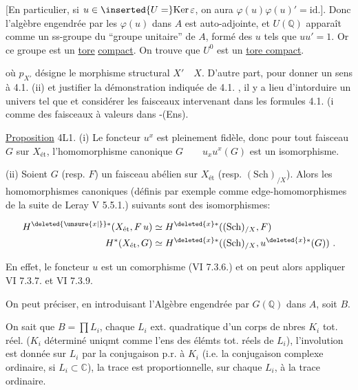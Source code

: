 [En particulier, si $u\in\inserted{U=}\mathrm{Ker}\,\varepsilon$, on aura $\varphi(u)\varphi(u)'=\mathrm{id}$.]. Donc l'algèbre engendrée par les $\varphi(u)$ dans $A$ est auto-adjointe, et $U(\mathbb Q)$ apparaît comme un ss-groupe du ``groupe unitaire'' de $A$, formé des $u$ tels que $uu'=1$.  Or ce  groupe est  un \uline{tore} \uline{compact}. On trouve que $U^0$ est un \uline{tore compact}.

où $p_{X'}$ désigne le morphisme structural $X'\quad X$. D'autre part, pour donner un sens à 4.1. (ii) et justifier la démonstration indiquée de 4.1. , il y a lieu d'intorduire un univers \quad tel que \qquad \unsure{,|;} et considérer les faisceaux intervenant dans les formules 4.1. (i comme des faisceaux à valeurs dans \quad -(Ens).

\uline{Proposition} 4L1. (i) Le foncteur $u^x$ est pleinement fidèle, donc pour tout faisceau $G$ sur $X_{\text{ét}}$, l'homomorphisme canonique $G\qquad u_x u^x(G)$ est un isomorphisme.

(ii) Soient $G$ (resp. $F$) un faisceau abélien sur $X_{\text{ét}}$ (resp. $(\mathrm{Sch})_{/X}$). Alors les homomorphismes canoniques (définis par exemple comme edge-homomorphismes de la suite  de Leray V 5.5.1.) suivants sont des isomorphismes:

\[
\begin{aligned}
H^{\deleted{\unsure{x|{}}}*}(X_{\text{ét}},F\,u)&\simeq H^{\deleted{x}*}((\mathrm{Sch})_{/X},F)\\
H^*(X_{\text{ét}},G)&\simeq H^{\deleted{x}*}((\mathrm{Sch})_{/X},u^{\deleted{x}*}(G))\ .
\end{aligned}
\]

En effet, le foncteur $u$ est un comorphisme (VI 7.3.6.) et on peut alors appliquer VI 7.3.7. et VI 7.3.9.

On peut préciser, en introduisant l'Algèbre engendrée par  $G(\mathbb Q)$ dans $A$, soit $B$.

On sait que $B=\prod L_i$, chaque $L_i$ ext. quadratique d'un corps de nbres $K_i$ tot. réel. ($K_i$ déterminé uniqmt   comme l'ens des élémts tot. réels de $L_i$), l'involution est donnée sur $L_i$ par la conjugaison p.r. à $K_i$ (i.e. la conjugaison complexe ordinaire, si $L_i\subset\mathbb C$), la trace est proportionnelle, sur chaque $L_i$, à la trace ordinaire.


